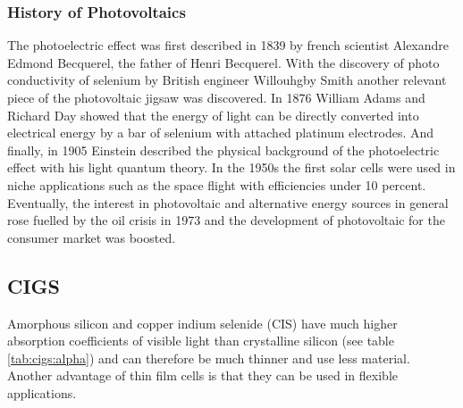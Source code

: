 \subsubsection{History of Photovoltaics}
The photoelectric effect was first described in 1839 by french scientist Alexandre Edmond Becquerel\cite{becquerel1839memoire}, the father of Henri Becquerel. 
With the discovery of photo conductivity of selenium
by British engineer Willouhgby Smith\cite{Smith1873Selenium} 
another relevant piece of the photovoltaic jigsaw was discovered. 
In 1876 William Adams and Richard Day\cite{Adams1876Selenium} showed that 
the energy of light can be directly converted into electrical energy by a bar of selenium with attached platinum electrodes.
And finally, in 1905 Einstein described the physical background of the photoelectric effect with his light quantum theory\cite{einstein1905erzeugung}.
In the 1950s the first solar cells were used in niche applications such as the space flight with efficiencies under 10 percent. 
Eventually, the interest in photovoltaic and alternative energy sources in general rose fuelled by the oil crisis in 1973 
and the development of photovoltaic for the consumer market was boosted. \\

\subsection{CIGS}
Amorphous silicon and copper indium selenide (CIS)  have much higher absorption coefficients of visible light than crystalline silicon (see table \ref{tab:cigs:alpha}) and can therefore be much thinner and use less material. 
Another advantage of thin film cells is that they can be used in flexible applications. 

